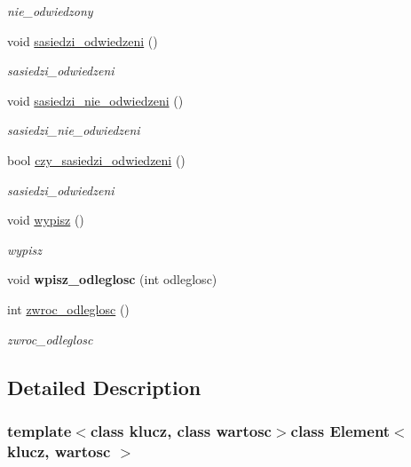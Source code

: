 \begin{DoxyCompactItemize}
\begin{DoxyCompactList}\small\item\em nie\+\_\+odwiedzony \end{DoxyCompactList}\item 
void \hyperlink{class_element_aea8ebe54afa2525740e1b065f9fd3a13}{sasiedzi\+\_\+odwiedzeni} ()
\begin{DoxyCompactList}\small\item\em sasiedzi\+\_\+odwiedzeni \end{DoxyCompactList}\item 
void \hyperlink{class_element_a04d9f1bebfc82dad1ca3e32e1f84fd5d}{sasiedzi\+\_\+nie\+\_\+odwiedzeni} ()
\begin{DoxyCompactList}\small\item\em sasiedzi\+\_\+nie\+\_\+odwiedzeni \end{DoxyCompactList}\item 
bool \hyperlink{class_element_a07619a03996d2a7261d78dea30319d7a}{czy\+\_\+sasiedzi\+\_\+odwiedzeni} ()
\begin{DoxyCompactList}\small\item\em sasiedzi\+\_\+odwiedzeni \end{DoxyCompactList}\item 
void \hyperlink{class_element_afd6003b54275449e8b67d34a842a87fc}{wypisz} ()
\begin{DoxyCompactList}\small\item\em wypisz \end{DoxyCompactList}\item 
\hypertarget{class_element_ae0248f2b0dac9b17f4a9194f578b3988}{void {\bfseries wpisz\+\_\+odleglosc} (int odleglosc)}\label{class_element_ae0248f2b0dac9b17f4a9194f578b3988}

\item 
int \hyperlink{class_element_a5eba01e4be54f34e12452769a7343499}{zwroc\+\_\+odleglosc} ()
\begin{DoxyCompactList}\small\item\em zwroc\+\_\+odleglosc \end{DoxyCompactList}\end{DoxyCompactItemize}


\subsection{Detailed Description}
\subsubsection*{template$<$class klucz, class wartosc$>$class Element$<$ klucz, wartosc $>$}

